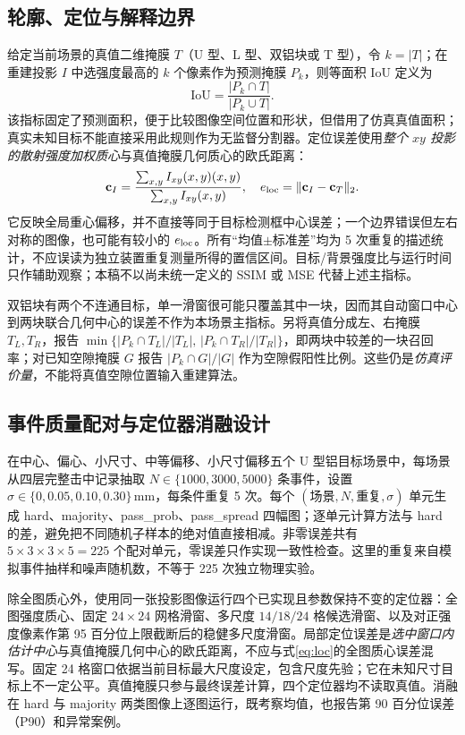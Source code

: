 \documentclass[UTF8,fontset=none,zihao=-4,a4paper]{ctexart}
\begin{document}
\subsection{轮廓、定位与解释边界}
给定当前场景的真值二维掩膜 $T$（U 型、L 型、双铝块或 T 型），令 $k=|T|$；在重建投影 $I$ 中选强度最高的 $k$ 个像素作为预测掩膜 $P_k$，则等面积 IoU 定义为
\begin{equation}
\mathrm{IoU}=\frac{|P_k\cap T|}{|P_k\cup T|}.
\label{eq:iou}
\end{equation}
该指标固定了预测面积，便于比较图像空间位置和形状，但借用了仿真真值面积；真实未知目标不能直接采用此规则作为无监督分割器。定位误差使用\emph{整个 $xy$ 投影的散射强度加权质心}与真值掩膜几何质心的欧氏距离：
\begin{equation}
\mathbf c_I=\frac{\sum_{x,y}I_{xy}(x,y)(x,y)}{\sum_{x,y}I_{xy}(x,y)},\quad
e_{\rm loc}=\|\mathbf c_I-\mathbf c_T\|_2.
\label{eq:loc}
\end{equation}
它反映全局重心偏移，并不直接等同于目标检测框中心误差；一个边界错误但左右对称的图像，也可能有较小的 $e_{\rm loc}$。所有“均值$\pm$标准差”均为 5 次重复的描述统计，不应误读为独立装置重复测量所得的置信区间。目标/背景强度比与运行时间只作辅助观察；本稿不以尚未统一定义的 SSIM 或 MSE 代替上述主指标。

双铝块有两个不连通目标，单一滑窗很可能只覆盖其中一块，因而其自动窗口中心到两块联合几何中心的误差不作为本场景主指标。另将真值分成左、右掩膜 $T_L,T_R$，报告 $\min\{|P_k\cap T_L|/|T_L|,\,|P_k\cap T_R|/|T_R|\}$，即两块中较差的一块召回率；对已知空隙掩膜 $G$ 报告 $|P_k\cap G|/|G|$ 作为空隙假阳性比例。这些仍是\emph{仿真评价量}，不能将真值空隙位置输入重建算法。

\subsection{事件质量配对与定位器消融设计}
在中心、偏心、小尺寸、中等偏移、小尺寸偏移五个 U 型铝目标场景中，每场景从四层完整击中记录抽取 $N\in\{1000,3000,5000\}$ 条事件，设置 $\sigma\in\{0,0.05,0.10,0.30\}$\,mm，每条件重复 5 次。每个 $(\text{场景},N,\text{重复},\sigma)$ 单元生成 hard、majority、pass\_prob、pass\_spread 四幅图；逐单元计算方法与 hard 的差，避免把不同随机子样本的绝对值直接相减。非零误差共有 $5\times3\times3\times5=225$ 个配对单元，零误差只作实现一致性检查。这里的重复来自模拟事件抽样和噪声随机数，不等于 225 次独立物理实验。

除全图质心外，使用同一张投影图像运行四个已实现且参数保持不变的定位器：全图强度质心、固定 $24\times24$ 网格滑窗、多尺度 $14/18/24$ 格候选滑窗、以及对正强度像素作第 95 百分位上限截断后的稳健多尺度滑窗。局部定位误差是\emph{选中窗口内估计中心}与真值掩膜几何中心的欧氏距离，不应与式\eqref{eq:loc}的全图质心误差混写。固定 24 格窗口依据当前目标最大尺度设定，包含尺度先验；它在未知尺寸目标上不一定公平。真值掩膜只参与最终误差计算，四个定位器均不读取真值。消融在 hard 与 majority 两类图像上逐图运行，既考察均值，也报告第 90 百分位误差（P90）和异常案例。
\end{document}
